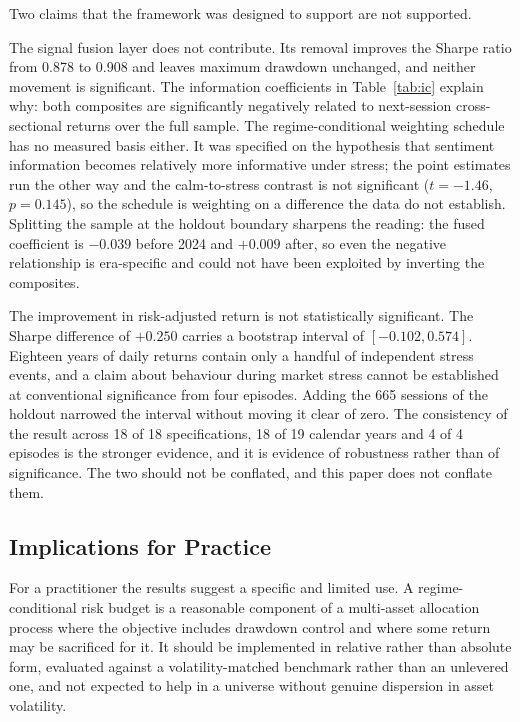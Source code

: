Two claims that the framework was designed to support are not supported.

The signal fusion layer does not contribute. Its removal improves the Sharpe ratio from
0.878 to 0.908 and leaves maximum drawdown unchanged, and neither movement is
significant. The information coefficients in Table~\ref{tab:ic} explain why: both composites are
significantly negatively related to next-session cross-sectional returns over the full
sample. The regime-conditional weighting schedule has no measured basis either. It was
specified on the hypothesis that sentiment information becomes relatively more
informative under stress; the point estimates run the other way and the calm-to-stress
contrast is not significant ($t = -1.46$, $p = 0.145$), so the schedule is weighting on a
difference the data do not establish. Splitting the sample at the holdout boundary
sharpens the reading: the fused coefficient is $-0.039$ before 2024 and $+0.009$ after,
so even the negative relationship is era-specific and could not have been exploited by
inverting the composites.

The improvement in risk-adjusted return is not statistically significant. The Sharpe
difference of $+0.250$ carries a bootstrap interval of $[-0.102, 0.574]$. Eighteen years
of daily returns contain only a handful of independent stress events, and a claim about
behaviour during market stress cannot be established at conventional significance from
four episodes. Adding the 665 sessions of the holdout narrowed the interval without
moving it clear of zero. The consistency of the result across 18 of 18 specifications,
18 of 19 calendar years and 4 of 4 episodes is the stronger evidence, and it is evidence of
robustness rather than of significance. The two should not be conflated, and this paper
does not conflate them.

\subsection{Implications for Practice}

For a practitioner the results suggest a specific and limited use. A regime-conditional
risk budget is a reasonable component of a multi-asset allocation process where the
objective includes drawdown control and where some return may be sacrificed for it. It
should be implemented in relative rather than absolute form, evaluated against a
volatility-matched benchmark rather than an unlevered one, and not expected to help in
a universe without genuine dispersion in asset volatility.

